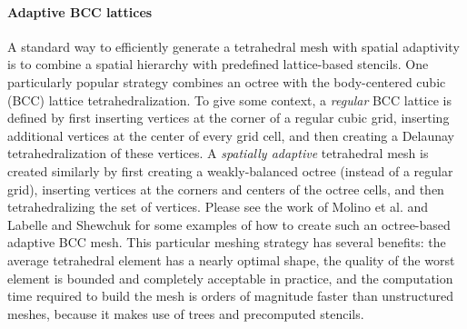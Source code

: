 \paragraph*{Adaptive BCC lattices} A standard way to efficiently generate a tetrahedral mesh with spatial adaptivity is to combine a spatial hierarchy with predefined lattice-based stencils. One particularly popular strategy combines an octree with the body-centered cubic (BCC) lattice tetrahedralization. To give some context, a {\em regular} BCC lattice is defined by first inserting vertices at the corner of a regular cubic grid, inserting additional vertices at the center of every grid cell, and then creating a Delaunay tetrahedralization of these vertices. A {\em spatially adaptive} tetrahedral mesh is created similarly by first creating a weakly-balanced octree (instead of a regular grid), inserting vertices at the corners and centers of the octree cells, and then tetrahedralizing the set of vertices. Please see the work of Molino et al. \cite{Molino2003} and Labelle and Shewchuk \cite{Labelle2007} for some examples of how to create such an octree-based adaptive BCC mesh. This particular meshing strategy has several benefits: the average tetrahedral element has a nearly optimal shape, the quality of the worst element is bounded and completely acceptable in practice, and the computation time required to build the mesh is orders of magnitude faster than unstructured meshes, because it makes use of trees and precomputed stencils.


